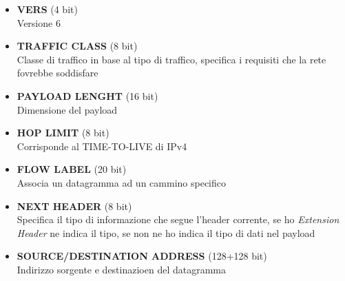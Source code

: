 \documentclass{article}
\begin{document}
                        \begin{itemize}
                            \item \textbf{VERS} (4 bit)\\
                                  Versione 6
                            \item \textbf{TRAFFIC CLASS} (8 bit)\\
                                  Classe di traffico in base al tipo di traffico, specifica i requisiti che la rete fovrebbe soddisfare
                            \item \textbf{PAYLOAD LENGHT} (16 bit)\\
                                  Dimensione del payload
                            \item \textbf{HOP LIMIT} (8 bit)\\
                                  Corrisponde al TIME-TO-LIVE di IPv4
                            \item \textbf{FLOW LABEL} (20 bit)\\
                                  Associa un datagramma ad un cammino specifico
                            \item \textbf{NEXT HEADER} (8 bit)\\
                                  Specifica il tipo di informazione che segue l'header corrente, se ho \textit{Extension Header} ne indica il tipo, se non ne ho indica il tipo di dati nel payload
                            \item \textbf{SOURCE/DESTINATION ADDRESS} (128+128 bit)\\
                                  Indirizzo sorgente e destinazioen del datagramma
                        \end{itemize}
\newpage
                    
\end{document}
